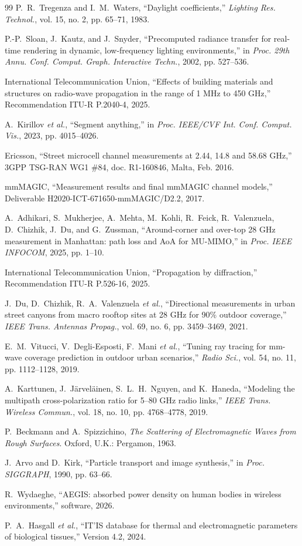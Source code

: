 \documentclass[journal]{IEEEtran}
\begin{document}
\begin{thebibliography}{99}
P.~R.~Tregenza and I.~M.~Waters, ``Daylight coefficients,'' \emph{Lighting Res.
Technol.}, vol. 15, no. 2, pp. 65--71, 1983.

P.-P.~Sloan, J.~Kautz, and J.~Snyder, ``Precomputed radiance transfer for
real-time rendering in dynamic, low-frequency lighting environments,'' in
\emph{Proc. 29th Annu. Conf. Comput. Graph. Interactive Techn.}, 2002,
pp. 527--536.

International Telecommunication Union, ``Effects of building materials and
structures on radio-wave propagation in the range of 1 MHz to 450 GHz,''
Recommendation ITU-R P.2040-4, 2025.

A.~Kirillov \emph{et al.}, ``Segment anything,'' in \emph{Proc. IEEE/CVF Int.
Conf. Comput. Vis.}, 2023, pp. 4015--4026.

Ericsson, ``Street microcell channel measurements at 2.44, 14.8 and 58.68 GHz,''
3GPP TSG-RAN WG1 \#84, doc. R1-160846, Malta, Feb. 2016.

mmMAGIC, ``Measurement results and final mmMAGIC channel models,'' Deliverable
H2020-ICT-671650-mmMAGIC/D2.2, 2017.

A.~Adhikari, S.~Mukherjee, A.~Mehta, M.~Kohli, R.~Feick, R.~Valenzuela,
D.~Chizhik, J.~Du, and G.~Zussman, ``Around-corner and over-top 28 GHz
measurement in Manhattan: path loss and AoA for MU-MIMO,'' in \emph{Proc. IEEE
INFOCOM}, 2025, pp. 1--10.

International Telecommunication Union, ``Propagation by diffraction,''
Recommendation ITU-R P.526-16, 2025.

J.~Du, D.~Chizhik, R.~A.~Valenzuela \emph{et al.}, ``Directional measurements in
urban street canyons from macro rooftop sites at 28 GHz for 90\% outdoor
coverage,'' \emph{IEEE Trans. Antennas Propag.}, vol. 69, no. 6,
pp. 3459--3469, 2021.

E.~M.~Vitucci, V.~Degli-Esposti, F.~Mani \emph{et al.}, ``Tuning ray tracing for
mm-wave coverage prediction in outdoor urban scenarios,'' \emph{Radio Sci.},
vol. 54, no. 11, pp. 1112--1128, 2019.

A.~Karttunen, J.~J\"arvel\"ainen, S.~L.~H.~Nguyen, and K.~Haneda, ``Modeling the
multipath cross-polarization ratio for 5--80 GHz radio links,'' \emph{IEEE Trans.
Wireless Commun.}, vol. 18, no. 10, pp. 4768--4778, 2019.

P.~Beckmann and A.~Spizzichino, \emph{The Scattering of Electromagnetic Waves
from Rough Surfaces}. Oxford, U.K.: Pergamon, 1963.

J.~Arvo and D.~Kirk, ``Particle transport and image synthesis,'' in
\emph{Proc. SIGGRAPH}, 1990, pp. 63--66.

R.~Wydaeghe, ``AEGIS: absorbed power density on human bodies in wireless
environments,'' software, 2026.

P.~A.~Hasgall \emph{et al.}, ``IT'IS database for thermal and electromagnetic
parameters of biological tissues,'' Version 4.2, 2024.

\end{thebibliography}
\end{document}
